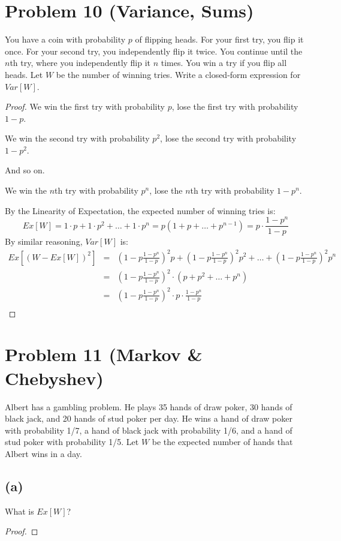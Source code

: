 \documentclass[14pt]{extarticle}
\begin{document}
\section{Problem 10 (Variance, Sums)}
You have a coin with probability $p$ of flipping heads. For your first try, you flip it once. For your second try, you independently flip it twice. You continue until the $n$th try, where you independently flip it $n$ times. You win a try if you flip all heads. Let $W$ be the number of winning tries. Write a closed-form expression for $Var[W]$.
\begin{proof}
We win the first try with probability $p$, lose the first try with probability $1 - p$.

We win the second try with probability $p^2$, lose the second try with probability $1 - p^2$.

And so on.

We win the $n$th try with probability $p^n$, lose the $n$th try with probability $1 - p^n$.

By the Linearity of Expectation, the expected number of winning tries is:
$$
Ex[W] = 1 \cdot p + 1 \cdot p^2 + \ldots + 1 \cdot p^n = p(1 + p + \ldots + p^{n-1}) = p\cdot\frac{1 - p^n}{1 - p}
$$
By similar reasoning, $Var[W]$ is:
$$
\begin{array}{ccc}
Ex[(W - Ex[W])^2] & = & \left(1 - p\frac{1 - p^n}{1 - p}\right)^2 p + \left(1 - p\frac{1 - p^n}{1 - p}\right)^2 p^2 + \ldots + \left(1 - p\frac{1 - p^n}{1 - p}\right)^2 p^n \\
& = & \left(1 - p\frac{1 - p^n}{1 - p}\right)^2\cdot(p + p^2 + \ldots + p^{n}) \\
& = & \left(1 - p\frac{1 - p^n}{1 - p}\right)^2 \cdot p\cdot\frac{1 - p^n}{1 - p} \\
\end{array}
$$
\end{proof}

\section{Problem 11 (Markov \& Chebyshev)}
Albert has a gambling problem. He plays 35 hands of draw poker, 30 hands of black jack, and 20 hands of stud poker per day. He wins a hand of draw poker with probability 1/7, a hand of black jack with probability 1/6, and a hand of stud poker with probability 1/5. Let $W$ be the expected number of hands that Albert wins in a day.
\subsection{(a)}
What is $Ex[W ]$?
\begin{proof}
\end{proof}
\end{document}
